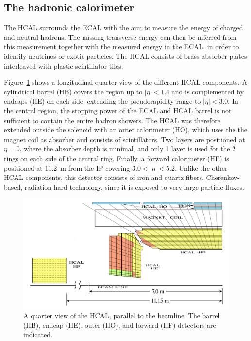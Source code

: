 \subsection{The hadronic calorimeter}

The \acf{HCAL} surrounds the \ac{ECAL} with the aim to measure the energy of charged and neutral hadrons. The missing transverse energy can then be inferred from this measurement together with the measured energy in the \ac{ECAL}, in order to identify neutrinos or exotic particles. The \ac{HCAL} consists of brass absorber plates interleaved with plastic scintillator tiles.

Figure~\ref{fig:hcal} shows a longitudinal quarter view of the different \ac{HCAL} components. A cylindrical barrel (HB) covers the region up to $|\eta| < 1.4$ and is complemented by endcaps (HE) on each side, extending the pseudorapidity range to $|\eta| < 3.0$. In the central region, the stopping power of the \ac{ECAL} and \ac{HCAL} barrel is not sufficient to contain the entire hadron showers. The \ac{HCAL} was therefore extended outside the solenoid with an outer calorimeter (HO), which uses the the magnet coil as absorber and consists of scintillators. Two layers are positioned at $\eta = 0$, where the absorber depth is minimal, and only 1 layer is used for the 2 rings on each side of the central ring. Finally, a forward calorimeter (HF) is positioned at 11.2~m from the \ac{IP} covering $3.0 < |\eta| < 5.2$. Unlike the other \ac{HCAL} components, this detector consists of iron and quartz fibers. Cherenkov-based, radiation-hard technology, since it is exposed to very large particle fluxes. 

\begin{figure}[ht]
  \centering
 \includegraphics[width=.8\textwidth]{hcal}
 \caption{A quarter view of the \protect\acf{HCAL}, parallel to the beamline. The barrel (HB), endcap (HE), outer (HO), and forward (HF) detectors are indicated.}
 \label{fig:hcal}
\end{figure}

